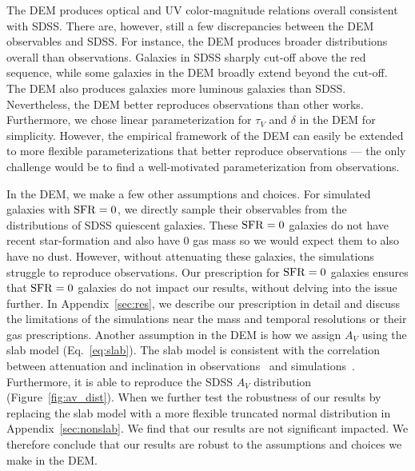 
The DEM produces optical and UV color-magnitude relations overall consistent
with SDSS. There are, however, still a few discrepancies between the DEM
observables and SDSS.  For instance, the DEM produces broader distributions
overall than observations.
Galaxies in SDSS sharply cut-off above the red sequence, while some galaxies in
the DEM broadly extend beyond the cut-off. The DEM also produces galaxies 
more luminous galaxies than SDSS. Nevertheless, the DEM better reproduces
observations than other works. Furthermore, we chose linear parameterization
for $\tau_V$ and $\delta$ in the DEM for simplicity. However, the
empirical framework of the DEM can easily be extended to more flexible
parameterizations that better reproduce observations --- the only challenge
would be to find a well-motivated parameterization from observations.

In the DEM, we make a few other assumptions and choices. For simulated galaxies
with ${\rm SFR}=0$, we directly sample their observables from the distributions of 
SDSS quiescent galaxies. These ${\rm SFR}=0$ galaxies do not have recent
star-formation and also have 0 gas mass so we would expect them to also have no dust. However, without
attenuating these galaxies, the simulations struggle to reproduce observations.
Our prescription for ${\rm SFR} = 0$ galaxies ensures that ${\rm SFR}=0$ galaxies do not
impact our results, without delving into the issue further. In
Appendix~\ref{sec:res}, we describe our prescription in detail and discuss the
limitations of the simulations near the mass and temporal resolutions or their
gas prescriptions. Another assumption in the DEM is how we assign $A_V$ using 
the slab model (Eq.~\ref{eq:slab}). The slab model is consistent with the
correlation between attenuation and inclination in
observations~\citep{conroy2010b, wild2011, battisti2017, salim2020} and
simulations~\citep[\eg][]{chevallard2013, narayanan2018, trayford2020}.
Furthermore, it is able to reproduce the SDSS $A_V$ distribution
(Figure~\ref{fig:av_dist}). When we further test the robustness of our results
by replacing the slab model with a more flexible truncated normal distribution 
in Appendix~\ref{sec:nonslab}. We find that our results are not significant
impacted. We therefore conclude that our results are robust to the assumptions and choices we make in the DEM. 

